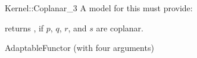 \begin{ccRefFunctionObjectConcept}{Kernel::Coplanar_3}
A model for this must provide:


{returns , if $p$, $q$, $r$, and $s$ are coplanar.}

\ccRefines
AdaptableFunctor (with four arguments)

\ccSeeAlso
{}\\

\end{ccRefFunctionObjectConcept}
